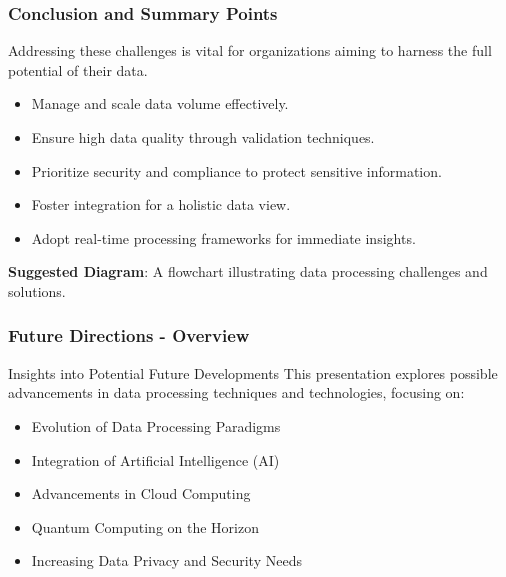 \documentclass[aspectratio=169]{beamer}
\begin{document}
\begin{frame}[fragile]
    \frametitle{Conclusion and Summary Points}
    Addressing these challenges is vital for organizations aiming to harness the full potential of their data. 
    \begin{itemize}
        \item Manage and scale data volume effectively.
        \item Ensure high data quality through validation techniques.
        \item Prioritize security and compliance to protect sensitive information.
        \item Foster integration for a holistic data view.
        \item Adopt real-time processing frameworks for immediate insights.
    \end{itemize}
    \textbf{Suggested Diagram}: A flowchart illustrating data processing challenges and solutions.
\end{frame}

\begin{frame}[fragile]
    \frametitle{Future Directions - Overview}
    \begin{block}{Insights into Potential Future Developments}
        This presentation explores possible advancements in data processing techniques and technologies, focusing on:
        \begin{itemize}
            \item Evolution of Data Processing Paradigms
            \item Integration of Artificial Intelligence (AI)
            \item Advancements in Cloud Computing
            \item Quantum Computing on the Horizon
            \item Increasing Data Privacy and Security Needs
        \end{itemize}
    \end{block}
\end{frame}
\end{document}
